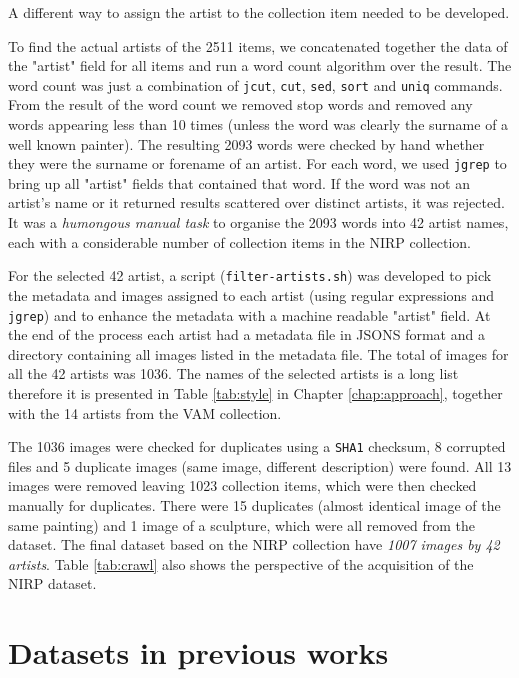 \documentclass[11pt,a4paper,twoside,openright]{report}
\begin{document}
A different way to assign the artist to the collection item needed to be
developed.

To find the actual artists of the 2511 items, we concatenated together the data
of the "artist" field for all items and run a word count algorithm over the
result.  The word count was just a combination of \texttt{jcut}, \texttt{cut},
\texttt{sed}, \texttt{sort} and \texttt{uniq} commands.  From the result of the
word count we removed stop words and removed any words appearing less than 10
times (unless the word was clearly the surname of a well known painter).  The
resulting 2093 words were checked by hand whether they were the surname or
forename of an artist.  For each word, we used \texttt{jgrep} to bring up all
"artist" fields that contained that word.  If the word was not an artist's name
or it returned results scattered over distinct artists, it was rejected.  It
was a \emph{humongous manual task} to organise the 2093 words into 42 artist
names, each with a considerable number of collection items in the NIRP
collection.

For the selected 42 artist, a script (\texttt{filter-artists.sh}) was developed
to pick the metadata and images assigned to each artist (using regular
expressions and \texttt{jgrep}) and to enhance the metadata with a machine
readable "artist" field.  At the end of the process each artist had a metadata
file in JSONS format and a directory containing all images listed in the
metadata file.  The total of images for all the 42 artists was 1036.  The names
of the selected artists is a long list therefore it is presented in Table
\ref{tab:style} in Chapter \ref{chap:approach}, together with the 14 artists
from the VAM collection.

The 1036 images were checked for duplicates using a \texttt{SHA1} checksum, 8
corrupted files and 5 duplicate images (same image, different description) were
found.  All 13 images were removed leaving 1023 collection items, which were
then checked manually for duplicates.  There were 15 duplicates (almost
identical image of the same painting) and 1 image of a sculpture, which were
all removed from the dataset.  The final dataset based on the NIRP collection
have \emph{1007 images by 42 artists}.  Table \ref{tab:crawl} also shows the
perspective of the acquisition of the NIRP dataset.

\section{Datasets in previous works}
\end{document}
